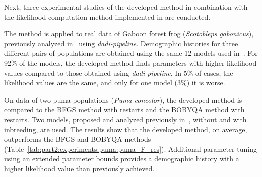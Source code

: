 \begin{table}[bh!]
\caption{Results of experimental studies for comparing parameter tuning methods on simulated data of three populations}
\end{table}

Next, three experimental studies of the developed method in combination with the likelihood computation method implemented in \dadi are conducted.

The method is applied to real data of Gaboon forest frog (\textit{Scotobleps gabonicus}), previously analyzed in~\cite{portik2017evaluating} using \textit{dadi-pipeline}.
Demographic histories for three different pairs of populations are obtained using the same 12 models used in~\cite{portik2017evaluating}.
For 92\% of the models, the developed method finds parameters with higher likelihood values compared to those obtained using \textit{dadi-pipeline}.
In 5\% of cases, the likelihood values are the same, and only for one model (3\%) it is worse.

On data of two puma populations (\textit{Puma concolor}), the developed method is compared to the BFGS method with restarts and the BOBYQA method with restarts.
Two models, proposed and analyzed previously in~\cite{blischak2020inferring}, without and with inbreeding, are used.
The results show that the developed method, on average, outperforms the BFGS and BOBYQA methods (Table~\ref{tab:part2:experiments:puma:puma_F_res}).
Additional parameter tuning using an extended parameter bounds provides a demographic history with a higher likelihood value than previously achieved.

